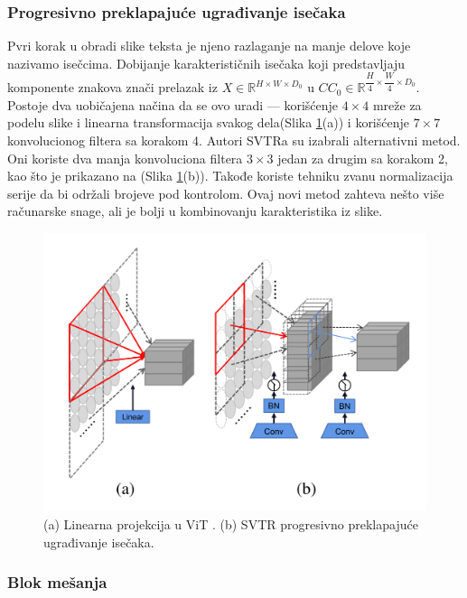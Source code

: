 \documentclass[a4paper,12pt]{article}
\begin{document}
	\subsubsection{Progresivno preklapajuće ugrađivanje isečaka}
	
	Pvri korak u obradi slike teksta je njeno razlaganje na manje delove koje nazivamo isečcima. Dobijanje karakterističnih isečaka koji predstavljaju komponente znakova znači prelazak iz \(X \in \mathbb{R}^{H \times W \times D_0}\) u \(CC_0 \in \mathbb{R}^{\dfrac{H}{4} \times \dfrac{W}{4} \times D_0}\). Postoje dva uobičajena načina da se ovo uradi — korišćenje \(4 \times 4\) mreže za podelu slike i linearna transformacija svakog dela(Slika \ref{fig:linear-projection-in-ViT}(a)) i korišćenje \(7 \times 7\) konvolucionog filtera sa korakom 4. Autori SVTRa su izabrali alternativni metod. Oni koriste dva manja konvoluciona filtera \(3 \times 3\) jedan za drugim sa korakom 2, kao što je prikazano na (Slika \ref{fig:linear-projection-in-ViT}(b)). Takođe koriste tehniku zvanu normalizacija serije da bi održali brojeve pod kontrolom. Ovaj novi metod zahteva nešto više računarske snage, ali je bolji u kombinovanju karakteristika iz slike.

	\begin{figure}[H]
		\centering
		\includegraphics[width=\textwidth]{assets/linear-projection-in-ViT.png}
		\caption{(a) Linearna projekcija u ViT \cite{dosovitskiy2021imageworth16x16words}. (b) SVTR progresivno preklapajuće ugrađivanje isečaka.}
		\label{fig:linear-projection-in-ViT}
	\end{figure}
	
	\subsubsection{Blok mešanja}
	
\end{document}
